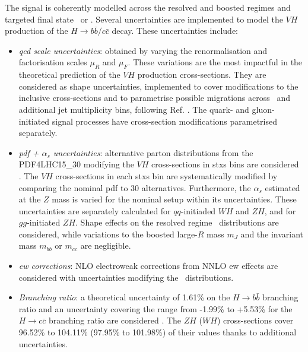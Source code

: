The signal is coherently modelled across the resolved and boosted regimes and targeted final state \vhb\ or \vhc. Several uncertainties are implemented to model the $VH$ production of the $H \rightarrow b\bar{b}/c\bar{c}$ decay. These uncertainties include:
\begin{itemize}[leftmargin=*]
    \item \textit{\gls{qcd} scale uncertainties}: obtained by varying the renormalisation and factorisation scales $\mu_R$ and $\mu_F$. These variations are the most impactful in the theoretical prediction of the $VH$ production cross-sections. They are considered as shape uncertainties, implemented to cover modifications to the inclusive cross-sections and to parametrise possible migrations across \ptv\ and additional jet multiplicity bins, following Ref. \cite{ATL-PHYS-PUB-2018-035}. The quark- and gluon-initiated signal processes have cross-section modifications parametrised separately. 
    \item \textit{\gls{pdf} + $\alpha_s$ uncertainties}: alternative parton distributions from the \textsc{PDF4LHC15\_30} modifying the $VH$ cross-sections in \gls{stxs} bins are considered  \cite{Butterworth:2015oua}. The $VH$ cross-sections in each \gls{stxs} bin are systematically modified by comparing the nominal \gls{pdf} to 30 alternatives. Furthermore, the $\alpha_s$ estimated at the $Z$ mass is varied for the nominal setup within its uncertainties. These uncertainties are separately calculated for $qq$-initiaded $WH$ and $ZH$, and for $gg$-initiated $ZH$. Shape effects on the resolved regime \ptv\ distributions are considered, while variations to the boosted large-$R$ mass $m_J$ and the invariant mass $m_{bb}$ or $m_{cc}$ are negligible.
    \item \textit{\gls{ew} corrections}: NLO electroweak corrections from NNLO \gls{ew} effects are considered with uncertainties modifying the \ptv\ distributions.
    \item \textit{Branching ratio}: a theoretical uncertainty of 1.61\% on the $H \rightarrow{b\bar{b}}$ branching ratio and an uncertainty covering the range from -1.99\% to +5.53\% for the $H \rightarrow{c\bar{c}}$ branching ratio are considered \cite{LHCHiggsCrossSectionWorkingGroup:2016ypw}. The $ZH$ ($WH$) cross-sections cover 96.52\% to 104.11\% (97.95\% to 101.98\%) of their values thanks to additional uncertainties.

\end{itemize}
